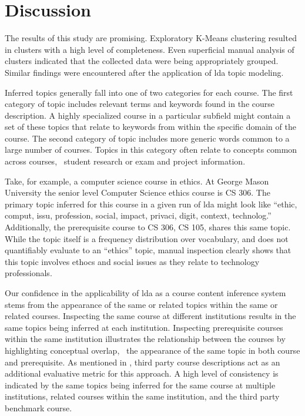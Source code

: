 \section{Discussion}
\label{sec:discussion}


The results of this study are promising.
Exploratory K-Means clustering resulted in clusters with a high level of completeness.
Even superficial manual analysis of clusters indicated that the collected data were being appropriately grouped.
Similar findings were encountered after the application of \ac{lda} topic modeling.


Inferred topics generally fall into one of two categories for each course.
The first category of topic includes relevant terms and keywords found in the course description.
A highly specialized course in a particular subfield might contain a set of these topics that relate to keywords from within the specific domain of the course.
The second category of topic includes more generic words common to a large number of courses.
Topics in this category often relate to concepts common across courses, \eg\ student research or exam and project information.


Take, for example, a computer science course in ethics.
At George Mason University the senior level Computer Science ethics course is CS 306.
The primary topic inferred for this course in a given run of \ac{lda} might look like ``ethic, comput, issu, profession, social, impact, privaci, digit, context, technolog.''
Additionally, the prerequisite course to CS 306, CS 105, shares this same topic.
While the topic itself is a frequency distribution over vocabulary, and does not quantifiably evaluate to an ``ethics'' topic, manual inspection clearly shows that this topic involves ethocs and social issues as they relate to technology professionals.


Our confidence in the applicability of \ac{lda} as a course content inference system stems from the appearance of the same or related topics within the same or related courses.
Inspecting the same course at different institutions results in the same topics being inferred at each institution.
Inspecting prerequisite courses within the same institution illustrates the relationship between the courses by highlighting conceptual overlap, \ie\ the appearance of the same topic in both course and prerequisite.
As mentioned in , third party course descriptions act as an additional evaluative metric for this approach.
A high level of consistency is indicated by the same topics being inferred for the same course at multiple institutions, related courses within the same institution, and the third party benchmark course.

